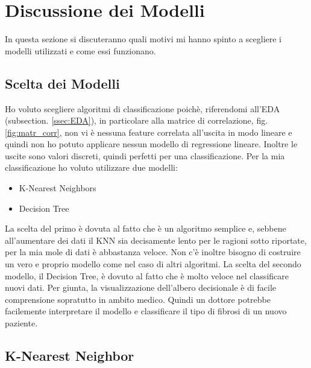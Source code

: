 \section{Discussione dei Modelli}\cite{STATISTICALLEARNING}

In questa sezione si discuteranno quali motivi mi hanno spinto a scegliere i modelli utilizzati e come essi funzionano.
\subsection{Scelta dei Modelli}

Ho voluto scegliere algoritmi di classificazione poichè, riferendomi all'EDA (subsection. \ref{ssec:EDA}), in particolare alla matrice di correlazione, fig.\ref{fig:matr_corr}, non vi è nessuna feature correlata all'uscita in modo lineare e quindi non ho potuto applicare nessun modello di regressione lineare. Inoltre le uscite sono valori discreti, quindi perfetti per una classificazione.
Per la mia classificazione ho voluto utilizzare due modelli:
\begin{itemize}
    \item K-Nearest Neighbors
    \item Decision Tree
\end{itemize}
La scelta del primo è dovuta al fatto che è un algoritmo semplice e, sebbene all'aumentare dei dati il KNN sia decisamente lento per le ragioni sotto riportate, per la mia mole di dati è abbastanza veloce. Non c'è inoltre bisogno di costruire un vero e proprio modello come nel caso di altri algoritmi.
\break La scelta del secondo modello, il Decision Tree, è dovuto al fatto che è molto veloce nel classificare nuovi dati. Per giunta, la visualizzazione dell'albero decisionale è di facile comprensione sopratutto in ambito medico. Quindi un dottore potrebbe facilemente interpretare il modello e classificare il tipo di fibrosi di un nuovo paziente. 

\subsection{K-Nearest Neighbor}


